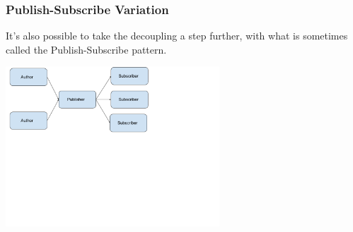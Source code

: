\documentclass[10pt]{beamer}
\begin{document}
\begin{frame}
  \frametitle{Publish-Subscribe Variation}
  
   It's also possible to take the decoupling a step further, with 
   what is sometimes called the Publish-Subscribe pattern. 
  
       
  \includegraphics[width=8cm]{pub-sub.png}
       
\end{frame} 
\end{document}
